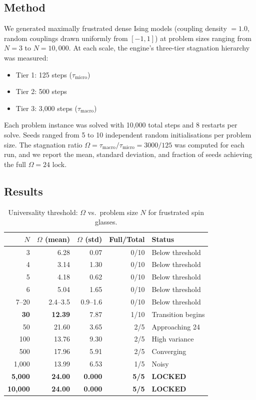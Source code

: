 \documentclass[11pt,a4paper]{article}
\begin{document}
\subsection{Method}

We generated maximally frustrated dense Ising models (coupling density $= 1.0$, random couplings drawn uniformly from $[-1,1]$) at problem sizes ranging from $N = 3$ to $N = 10{,}000$.
At each scale, the engine's three-tier stagnation hierarchy was measured:
\begin{itemize}[nosep]
\item Tier 1: 125 steps ($\tau_{\mathrm{micro}}$)
\item Tier 2: 500 steps
\item Tier 3: 3{,}000 steps ($\tau_{\mathrm{macro}}$)
\end{itemize}
Each problem instance was solved with 10{,}000 total steps and 8 restarts per solve.
Seeds ranged from 5 to 10 independent random initialisations per problem size.
The stagnation ratio $\Omega = \tau_{\mathrm{macro}}/\tau_{\mathrm{micro}} = 3000/125$ was computed for each run, and we report the mean, standard deviation, and fraction of seeds achieving the full $\Omega = 24$ lock.

\subsection{Results}

\begin{table}[H]
\centering
\caption{Universality threshold: $\Omega$ vs.\ problem size $N$ for frustrated spin glasses.}
\label{tab:universality}
\begin{tabular}{rrrrl}
\toprule
\textbf{$N$} & \textbf{$\Omega$ (mean)} & \textbf{$\Omega$ (std)} & \textbf{Full/Total} & \textbf{Status}\\
\midrule
3 & 6.28 & 0.07 & 0/10 & Below threshold\\
4 & 3.14 & 1.30 & 0/10 & Below threshold\\
5 & 4.18 & 0.62 & 0/10 & Below threshold\\
6 & 5.04 & 1.65 & 0/10 & Below threshold\\
7--20 & 2.4--3.5 & 0.9--1.6 & 0/10 & Below threshold\\
\textbf{30} & \textbf{12.39} & 7.87 & 1/10 & Transition begins\\
50 & 21.60 & 3.65 & 2/5 & Approaching 24\\
100 & 13.76 & 9.30 & 2/5 & High variance\\
500 & 17.96 & 5.91 & 2/5 & Converging\\
1{,}000 & 13.99 & 6.53 & 1/5 & Noisy\\
\textbf{5{,}000} & \textbf{24.00} & \textbf{0.000} & \textbf{5/5} & \textbf{LOCKED}\\
\textbf{10{,}000} & \textbf{24.00} & \textbf{0.000} & \textbf{5/5} & \textbf{LOCKED}\\
\bottomrule
\end{tabular}
\end{table}
\end{document}
